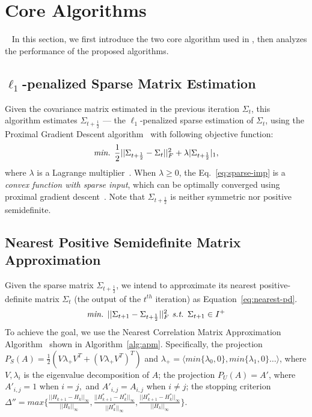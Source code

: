 \section{\TheName{} Core Algorithms}~\label{sec:4}
In this section, we first introduce the two core algorithm used in \TheName{}, then analyzes the performance of the proposed algorithms.

\subsection{$\ell_1$-penalized Sparse Matrix Estimation}
Given the covariance matrix estimated in the previous iteration $\Sigma_{t}$, this algorithm estimates $\Sigma_{t+\frac{1}{2}}$ --- the $\ell_1$-penalized sparse estimation of $\Sigma_{t}$, using the Proximal Gradient Descent algorithm~\cite{nesterov2004introductory} with following objective function:   
\begin{equation}
\emph{min. }\frac{1}{2}||\Sigma_{t+\frac{1}{2}}-\Sigma_t||_F^2+\lambda |\Sigma_{t+\frac{1}{2}}|_1,
\label{eq:sparse-imp}
\end{equation}
where $\lambda$ is a Lagrange multiplier~\cite{wu2009karush}. 
When $\lambda\geq 0$, the Eq.~\ref{eq:sparse-imp} is a \emph{convex function with sparse input}, which can be optimally converged using proximal gradient descent~\cite{nesterov2004introductory}. 
Note that $\Sigma_{t+\frac{1}{2}}$ is neither symmetric nor positive semidefinite.



\subsection{Nearest Positive Semidefinite Matrix Approximation}
Given the sparse matrix $\Sigma_{t+\frac{1}{2}}$, we intend to approximate its nearest positive-definite matrix $\Sigma_{t}$ (the output of the $t^{th}$ iteration) as Equation~\ref{eq:nearest-pd}. 
%
\begin{equation}
\emph{min. } ||\Sigma_{t+1}-\Sigma_{t+\frac{1}{2}}||_F^2 \emph{ s.t. }\Sigma_{t+1}\in  {\bf }I^+
\label{eq:nearest-pd}
\end{equation}
%
To achieve the goal, we use the Nearest Correlation Matrix Approximation Algorithm~\cite{higham2002computing} shown in Algorithm~\ref{alg:apm}.
Specifically, the projection $P_S(A)=\frac{1}{2}(V\lambda_+V^T+(V\lambda_+V^T)^T)$ and  $\lambda_+=\langle min\{\lambda_0,0\},min\{\lambda_1,0\}\dots  \rangle$, where $V,\lambda_i$ is the eigenvalue decomposition of $A$; the projection $P_U(A)=A'$, where $A'_{i,j}=1$ when $i=j,$ and $A'_{i,j}=A_{i,j}$ when $i\neq j$; the stopping criterion $\Delta''=max\{\frac{||H_{k+1}-H_k||_\infty}{||H_k||_\infty}, \frac{||H_{k+1}^*-H_k^*||_\infty}{||H_k^*||_\infty}, \frac{||H_{k+1}^*-H_k^*||_\infty}{||H_k||_\infty}\}$.
 
